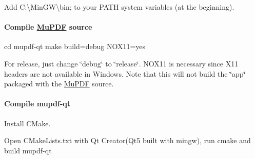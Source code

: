 Add {\ttfamily C\-:\textbackslash{}Min\-G\-W\textbackslash{}bin;} to your P\-A\-T\-H system variables (at the beginning).

\paragraph*{Compile \hyperlink{namespace_mu_p_d_f}{Mu\-P\-D\-F} source}

\begin{DoxyVerb}cd mupdf-qt
make build=debug NOX11=yes
\end{DoxyVerb}


For release, just change \char`\"{}debug\char`\"{} to \char`\"{}release\char`\"{}. N\-O\-X11 is necessary since X11 headers are not available in Windows. Note that this will not build the \char`\"{}app\char`\"{} packaged with the \hyperlink{namespace_mu_p_d_f}{Mu\-P\-D\-F} source.

\paragraph*{Compile mupdf-\/qt}

Install C\-Make.

Open C\-Make\-Lists.\-txt with Qt Creator(\-Qt5 built with mingw), run cmake and build mupdf-\/qt 